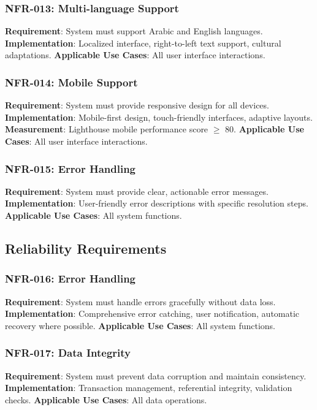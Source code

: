 \documentclass[12pt,a4paper]{article}
\begin{document}
\subsubsection{NFR-013: Multi-language Support}
\textbf{Requirement}: System must support Arabic and English languages.
\textbf{Implementation}: Localized interface, right-to-left text support, cultural adaptations.
\textbf{Applicable Use Cases}: All user interface interactions.

\subsubsection{NFR-014: Mobile Support}
\textbf{Requirement}: System must provide responsive design for all devices.
\textbf{Implementation}: Mobile-first design, touch-friendly interfaces, adaptive layouts.
\textbf{Measurement}: Lighthouse mobile performance score \(\geq\) 80.
\textbf{Applicable Use Cases}: All user interface interactions.

\subsubsection{NFR-015: Error Handling}
\textbf{Requirement}: System must provide clear, actionable error messages.
\textbf{Implementation}: User-friendly error descriptions with specific resolution steps.
\textbf{Applicable Use Cases}: All system functions.

\subsection{Reliability Requirements}

\subsubsection{NFR-016: Error Handling}
\textbf{Requirement}: System must handle errors gracefully without data loss.
\textbf{Implementation}: Comprehensive error catching, user notification, automatic recovery where possible.
\textbf{Applicable Use Cases}: All system functions.

\subsubsection{NFR-017: Data Integrity}
\textbf{Requirement}: System must prevent data corruption and maintain consistency.
\textbf{Implementation}: Transaction management, referential integrity, validation checks.
\textbf{Applicable Use Cases}: All data operations.
\end{document}
